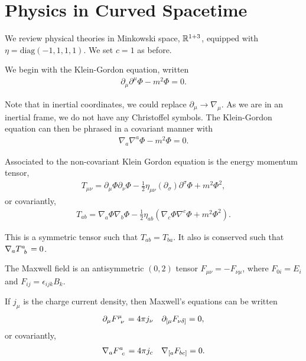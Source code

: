 \part{Physics in Curved Spacetime}


We review physical theories in Minkowski space, $\mathbb{R}^{1+3}$, equipped with $\eta = \text{diag} \left( -1,1,1,1 \right) $. We set $c = 1$ as before.

We begin with the Klein-Gordon equation, written
\begin{align}
    \partial_\mu \partial^{\mu} \Phi - m^2 \Phi = 0
.\end{align}

Note that in inertial coordinates, we could replace $\partial_\mu \to \nabla_\mu$. As we are in an inertial frame, we do not have any Christoffel symbols. The Klein-Gordon equation can then be phrased in a covariant manner with
\begin{align}
    \nabla_a \nabla^{a} \Phi - m^2 \Phi = 0
.\end{align}

Associated to the non-covariant Klein Gordon equation is the energy momentum tensor,
\begin{align}
    T_{\mu \nu} = \partial_\mu \Phi \partial_\nu \Phi - \frac{1}{2} \eta_{\mu \nu} \left( \partial_\sigma \right)  \partial^{\sigma} \Phi + m^2 \Phi^2
,\end{align}
or covariantly,
\begin{align}
    T_{ab} = \nabla_a \Phi \nabla_b \Phi - \frac{1}{2} \eta_{ab} \left( \nabla_c \Phi \nabla^{c} \Phi + m^2 \Phi^2 \right) 
.\end{align}

This is a symmetric tensor such that $T_{ab} = T_{ba}$. It also is conserved such that $\nabla_a \tensor{T}{^{a}_b} = 0$.

The Maxwell field is an antisymmetric $\left( 0,2 \right) $ tensor $F_{\mu \nu} = - F_{\nu \mu}$, where $F_{0i} = E_i$ and $F_{ij} = \epsilon_{ij k} B_k$. 

If $j_\mu$ is the charge current density, then Maxwell's equations can be written
\begin{align}
    \partial_\mu \tensor{F}{^{\mu}_{\nu}} = 4\pi j_\nu && \partial_{[\mu} F_{\nu \delta ]} = 0
,\end{align}
or covariantly,
\begin{align}
    \nabla_{a} \tensor{F}{^{a}_c} = 4\pi j_c && \nabla_{[a} F_{bc]} = 0
.\end{align}

